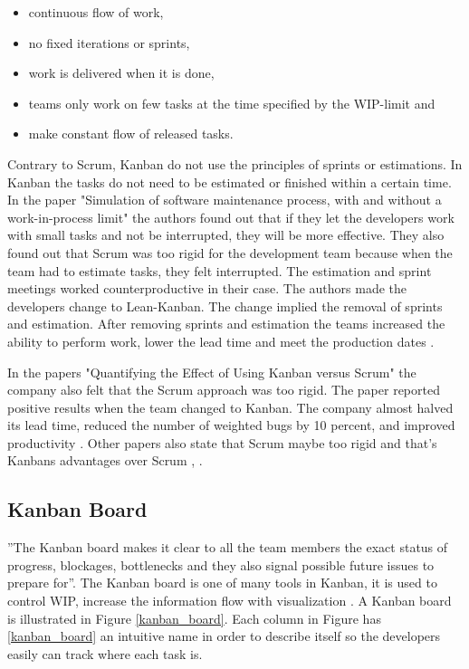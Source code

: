 \documentclass[UKenglish]{ifimaster}  %
\begin{document}
\begin{itemize}
\item continuous flow of work,
\item	no fixed iterations or sprints,
\item work is delivered when it is done,
\item teams only work on few tasks at the time specified by the WIP-limit and
\item make constant flow of released tasks.
\end{itemize}


Contrary to Scrum, Kanban do not use the principles of sprints or estimations. In Kanban the tasks do not need to be estimated or finished within a certain time. In the paper "Simulation of software maintenance process, with and without a work-in-process limit" \parencite{SMR:SMR1599} the authors found out that if they let the developers work with small tasks and not be interrupted, they will be more effective. They also found out that Scrum was too rigid for the development team because when the team had to estimate tasks, they felt interrupted.  The estimation and sprint meetings worked counterproductive in their case. The authors made the developers change to Lean-Kanban.  The change implied the removal of sprints and estimation. After removing sprints and estimation the teams increased the ability to perform work, lower the lead time and meet the production dates \parencite{SMR:SMR1599}.

In the papers "Quantifying the Effect of Using Kanban versus Scrum" the company also felt that the Scrum approach was too rigid. The paper reported positive results when the team changed to Kanban.  The company almost halved its lead time, reduced the number of weighted bugs by 10 percent, and improved productivity \parencite{Dag}. Other papers also state that Scrum maybe too rigid and that's Kanbans advantages over Scrum \parencite{beedle1999scrum}, \parencite{brekkanintroducing}.  

\subsection {Kanban Board}
''The Kanban board makes it clear to all the team members the exact status of progress, blockages, bottlenecks and they also signal possible future issues to prepare for''\parencite{Joyce}.  The Kanban board is one of many tools in Kanban, it is used to control WIP, increase the information flow with visualization \parencite{SMR:SMR1599}. A Kanban board is illustrated in Figure \ref{kanban_board}. Each column in Figure has \ref{kanban_board} an intuitive name in order to describe itself so the developers easily can track where each task is. 
\end{document}
